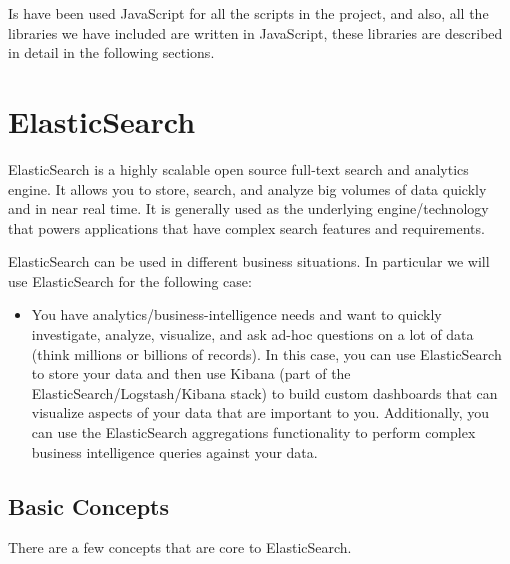 \documentclass[a4paper, 12pt]{book}
\begin{document}
Is have been used JavaScript for all the scripts in the project, and also, all the libraries we have included are written in JavaScript, these libraries are described in detail in the following sections.

\section{ElasticSearch}
\label{sec:ElasticSearch}
ElasticSearch is a highly scalable open source full-text search and analytics engine. It allows you to store, search, and analyze big volumes of data quickly and in near real time. It is generally used as the underlying engine/technology that powers applications that have complex search features and requirements.

ElasticSearch can be used in different business situations. In particular we will use ElasticSearch for the following case:

\begin{itemize}
\item You have analytics/business-intelligence needs and want to quickly investigate, analyze, visualize, and ask ad-hoc questions on a lot of data (think millions or billions of records). In this case, you can use ElasticSearch to store your data and then use Kibana (part of the ElasticSearch/Logstash/Kibana stack) to build custom dashboards that can visualize aspects of your data that are important to you. Additionally, you can use the ElasticSearch aggregations functionality to perform complex business intelligence queries against your data.
\end{itemize}

\subsection{Basic Concepts}
There are a few concepts that are core to ElasticSearch.
\end{document}
